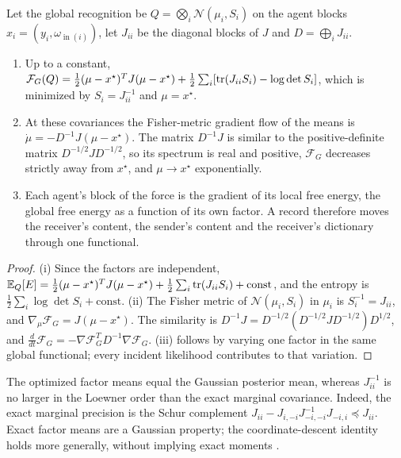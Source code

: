 Let the global recognition be $Q=\bigotimes_i\mathcal N(\mu_i,S_i)$ on the agent blocks $x_i=(y_i,\omega_{\operatorname{in}(i)})$, let $J_{ii}$ be the diagonal blocks of $J$ and $D=\bigoplus_iJ_{ii}$.
\begin{enumerate}
\item[(i)] Up to a constant, $\mathcal F_G(Q)=\frac12(\mu-x^\star)^TJ(\mu-x^\star)+\frac12\sum_i[\operatorname{tr}(J_{ii}S_i)-\log\det S_i]$, which is minimized by $S_i=J_{ii}^{-1}$ and $\mu=x^\star$.
\item[(ii)] At these covariances the Fisher-metric gradient flow of the means is $\dot\mu=-D^{-1}J(\mu-x^\star)$. The matrix $D^{-1}J$ is similar to the positive-definite matrix $D^{-1/2}JD^{-1/2}$, so its spectrum is real and positive, $\mathcal F_G$ decreases strictly away from $x^\star$, and $\mu\to x^\star$ exponentially.
\item[(iii)] Each agent's block of the force is the gradient of its local free energy, the global free energy as a function of its own factor. A record therefore moves the receiver's content, the sender's content and the receiver's dictionary through one functional.
\end{enumerate}
\begin{proof}
(i) Since the factors are independent, $\mathbb E_Q[E]=\frac12(\mu-x^\star)^TJ(\mu-x^\star)+\frac12\sum_i\operatorname{tr}(J_{ii}S_i)+\mathrm{const}$, and the entropy is $\frac12\sum_i\log\det S_i+\mathrm{const}$. (ii) The Fisher metric of $\mathcal N(\mu_i,S_i)$ in $\mu_i$ is $S_i^{-1}=J_{ii}$, and $\nabla_\mu\mathcal F_G=J(\mu-x^\star)$. The similarity is $D^{-1}J=D^{-1/2}(D^{-1/2}JD^{-1/2})D^{1/2}$, and $\frac d{dt}\mathcal F_G=-\nabla\mathcal F_G^TD^{-1}\nabla\mathcal F_G$. (iii) follows by varying one factor in the same global functional; every incident likelihood contributes to that variation.
\end{proof}

The optimized factor means equal the Gaussian posterior mean, whereas $J_{ii}^{-1}$ is no larger in the Loewner order than the exact marginal covariance. Indeed, the exact marginal precision is the Schur complement $J_{ii}-J_{i,-i}J_{-i,-i}^{-1}J_{-i,i}\preceq J_{ii}$. Exact factor means are a Gaussian property; the coordinate-descent identity holds more generally, without implying exact moments \citep{Bishop2006}.

